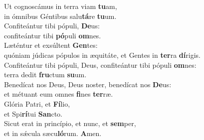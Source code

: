 \evenverse Ut cognoscámus in terra viam \textbf{tu}am,~\*\\
\evenverse in ómnibus Géntibus salu\textbf{tá}re \textbf{tu}um.\\
\oddverse Confiteántur tibi pópuli, \textbf{De}us:~\*\\
\oddverse confiteántur tibi \textbf{pó}puli \textbf{om}nes.\\
\evenverse Læténtur et exsúltent \textbf{Gen}tes:~\*\\
\evenverse quóniam júdicas pópulos in æquitáte, et Gentes in \textbf{ter}ra \textbf{dí}rigis.\\
\oddverse Confiteántur tibi pópuli, Deus, confiteántur tibi pópuli \textbf{om}nes:~\*\\
\oddverse terra dedit \textbf{fru}ctum \textbf{su}um.\\
\evenverse Benedícat nos Deus, Deus noster, benedícat nos \textbf{De}us:~\*\\
\evenverse et métuant eum omnes \textbf{fi}nes \textbf{ter}ræ.\\
\oddverse Glória Patri, et \textbf{Fí}lio,~\*\\
\oddverse et Spi\textbf{rí}tui \textbf{San}cto.\\
\evenverse Sicut erat in princípio, et nunc, et \textbf{sem}per,~\*\\
\evenverse et in sǽcula sæcu\textbf{ló}rum. \textbf{A}men.\\
